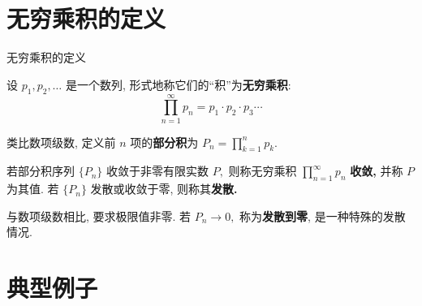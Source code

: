 
\section[定义]{无穷乘积的定义}


\begin{frame}{无穷乘积的定义}

设 $p_1, p_2, \ldots$ 是一个数列, 形式地称它们的``积''为\textbf{无穷乘积}:
\[
\prod_{n=1}^\infty p_n = p_1 \cdot p_2 \cdot p_3 \cdots
\]

\pause
\vspace{0.3em}

类比数项级数, 定义前 $n$ 项的\textbf{部分积}为 $P_n = \prod\limits_{k=1}^n p_k.$

\pause

\begin{Def}[无穷乘积的收敛性]
若部分积序列 $\{P_n\}$ 收敛于\alert{非零}有限实数 $P,$ 则称无穷乘积 $\prod\limits_{n=1}^\infty p_n$ \textbf{收敛,} 并称 $P$ 为其值. 若 $\{P_n\}$ 发散或收敛于零, 则称其\textbf{发散.}
\end{Def}

\pause
\vspace{0.3em}

\begin{attnblock}
与数项级数相比, 要求极限值\alert{非零}. 若 $P_n \to 0,$ 称为\textbf{发散到零}, 是一种特殊的发散情况.
\end{attnblock}

\end{frame}


\section[典型例子]{典型例子}


